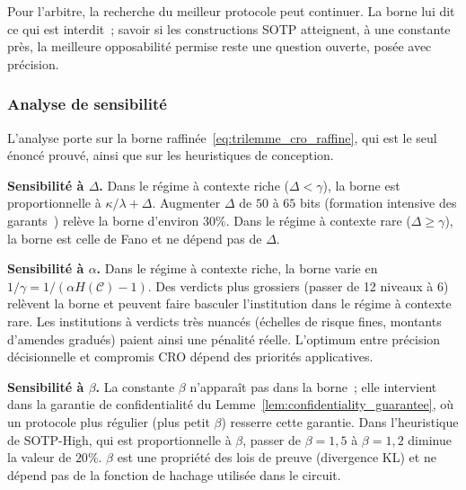 \begin{sloppypar}
\begin{boiteArbitre}
Pour l'arbitre, la recherche du meilleur protocole peut
continuer. La borne lui dit ce qui est interdit~; savoir si les constructions SOTP
atteignent, \`a une constante pr\`es, la meilleure opposabilit\'e permise reste une question
ouverte, pos\'ee avec pr\'ecision.
\end{boiteArbitre}

\subsubsection{Analyse de sensibilit\'e}
\label{subsubsec:analyse_sensibilite}

L'analyse porte sur la borne raffin\'ee~\eqref{eq:trilemme_cro_raffine}, qui est le seul
\'enonc\'e prouv\'e, ainsi que sur les heuristiques de conception.

\textbf{Sensibilit\'e \`a $\Delta$.} Dans le r\'egime \`a contexte riche ($\Delta < \gamma$),
la borne est proportionnelle \`a $\kappa/\lambda + \Delta$. Augmenter $\Delta$ de $50$ \`a
$65$ bits (formation intensive des garants~\cite{Ericsson95}) rel\`eve la borne d'environ
$30\%$. Dans le r\'egime \`a contexte rare ($\Delta \geq \gamma$), la borne est celle de
Fano et ne d\'epend pas de $\Delta$.

\textbf{Sensibilit\'e \`a $\alpha$.} Dans le r\'egime \`a contexte riche, la borne varie en
$1/\gamma = 1/(\alpha H(\mathcal{C}) - 1)$. Des verdicts plus grossiers (passer de 12
niveaux \`a 6) rel\`event la borne et peuvent faire basculer l'institution dans le
r\'egime \`a contexte rare. Les institutions \`a verdicts tr\`es nuanc\'es (\'echelles de risque
fines, montants d'amendes gradu\'es) paient ainsi une p\'enalit\'e r\'eelle. L'optimum entre
pr\'ecision d\'ecisionnelle et compromis CRO d\'epend des priorit\'es applicatives.

\textbf{Sensibilit\'e \`a $\beta$.} La constante $\beta$ n'appara\^it pas dans la borne~;
elle intervient dans la garantie de confidentialit\'e du
Lemme~\ref{lem:confidentiality_guarantee}, o\`u un protocole plus r\'egulier (plus petit
$\beta$) resserre cette garantie. Dans l'heuristique de SOTP-High, qui est
proportionnelle \`a $\beta$, passer de $\beta = 1{,}5$ \`a $\beta = 1{,}2$ diminue
la valeur de $20\%$. $\beta$ est une propri\'et\'e des lois de preuve (divergence
KL) et ne d\'epend pas de la fonction de hachage utilis\'ee dans le circuit.
\end{sloppypar}

